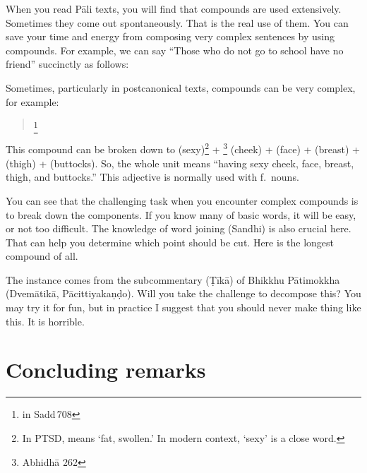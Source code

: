 When you read P\=ali texts, you will find that compounds are used extensively. Sometimes they come out spontaneously. That is the real use of them. You can save your time and energy from composing very complex sentences by using compounds. For example, we can say ``Those who do not go to school have no friend'' succinctly as follows:


Sometimes, particularly in postcanonical texts, compounds can be very complex, for example:

\begin{quote}
\footnote{in Sadd\,708}
\end{quote}

This  compound can be broken down to  (sexy)\footnote{In PTSD,  means `fat, swollen.' In modern context, `sexy' is a close word.} + \footnote{Abhidh\=a 262} (cheek) +  (face) +  (breast) +  (thigh) +  (buttocks). So, the whole unit means ``having sexy cheek, face, breast, thigh, and buttocks.'' This adjective is normally used with f.\ nouns.

You can see that the challenging task when you encounter complex compounds is to break down the components. If you know many of basic words, it will be easy, or not too difficult. The knowledge of word joining (Sandhi) is also crucial here. That can help you determine which point should be cut. Here is the longest compound of all.

\begin{quote}
\end{quote}

The instance comes from the subcommentary (\d T\=ik\=a) of Bhik\-khu P\=atimokkha (Dvem\=atik\=a, P\=acittiyaka\d n\d do). Will you take the challenge to decompose this? You may try it for fun, but in practice I suggest that you should never make thing like this. It is horrible.

\section*{Concluding remarks}

